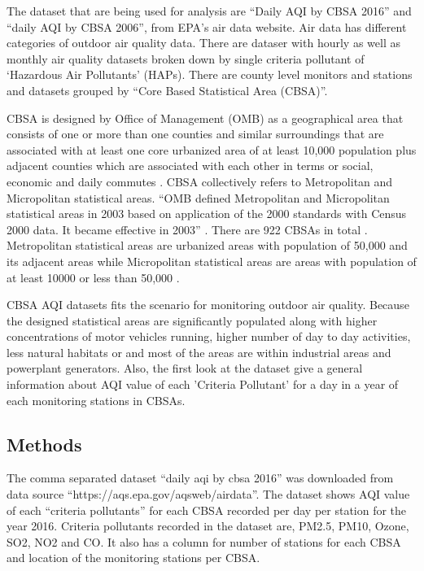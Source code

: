 \documentclass[sigconf]{acmart}
\begin{document}
   The dataset that are being used for analysis are ``Daily AQI by CBSA 2016'' and ``daily AQI by CBSA 2006'', from EPA's air data website. Air data has different categories of outdoor air quality data. There are dataser with hourly as well as monthly air quality datasets broken down by single criteria pollutant of `Hazardous Air Pollutants' (HAPs). There are county level monitors and stations and datasets grouped by ``Core Based Statistical Area (CBSA)''. 

   CBSA is designed by Office of Management (OMB) as a geographical area that consists of one or more than one counties and similar surroundings that are associated with at least one core urbanized area of at least 10,000 population plus adjacent counties which are associated with each other in terms or social, economic and daily commutes \cite{www-census-gov}. CBSA collectively refers to Metropolitan and Micropolitan statistical areas. ``OMB defined Metropolitan and Micropolitan statistical areas in 2003 based on application of the 2000 standards with Census 2000 data. It became effective in 2003'' \cite{www-census-gov}. There are 922 CBSAs in total \cite{www-census-gov}. Metropolitan statistical areas are urbanized areas with population of 50,000 and its adjacent areas  while Micropolitan statistical areas are areas with population of at least 10000 or less than 50,000 \cite{www-census-gov}. 

   CBSA AQI datasets fits the scenario for monitoring outdoor air quality. Because the designed statistical areas are significantly populated along with higher concentrations of motor vehicles running, higher number of day to day activities, less natural habitats or and most of the areas are within industrial areas and powerplant generators. Also, the first look at the dataset give a general information about AQI value of each 'Criteria Pollutant' for a day in a year of each monitoring stations in CBSAs. 

\subsection{Methods}
   The comma separated dataset ``daily aqi by cbsa 2016'' was downloaded from data source ``https://aqs.epa.gov/aqsweb/airdata''. The dataset shows AQI value of each ``criteria pollutants'' for each CBSA recorded per day per station for the year 2016. Criteria pollutants recorded in the dataset are, PM2.5, PM10, Ozone, SO2, NO2 and CO. It also has a column for number of stations for each CBSA and location of the monitoring stations per CBSA. 
\end{document}
